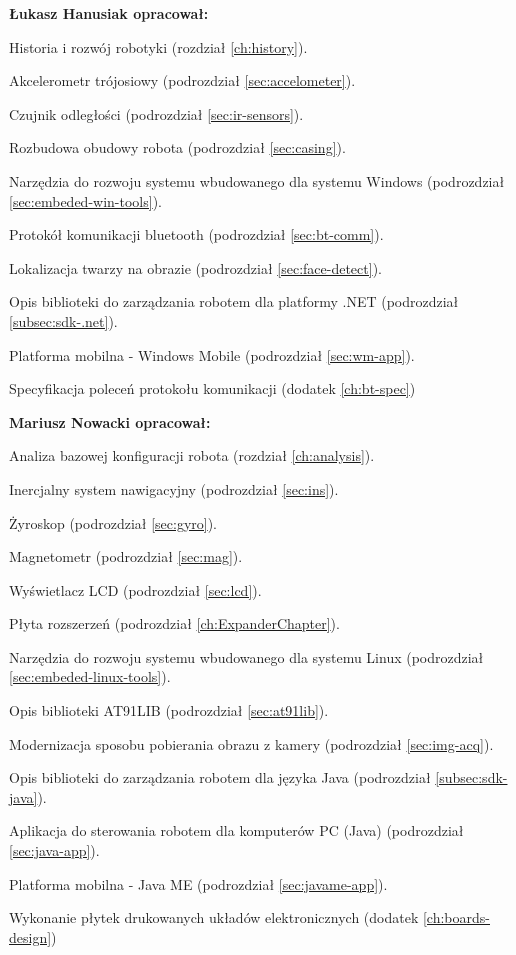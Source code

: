 \documentclass[a4paper,12pt, oneside]{mwbk}
\newenvironment{item-list}
{\begin{itemize}
  \setlength{\itemsep}{0mm}
  \setlength{\parskip}{0pt}
  \setlength{\parsep}{1pt}}
{\end{itemize}}
\begin{document}
\textbf{Łukasz Hanusiak opracował:}
\begin{item-list}
  \item Historia i rozwój robotyki (rozdział \ref{ch:history}).
  \item Akcelerometr trójosiowy (podrozdział \ref{sec:accelometer}).
  \item Czujnik odległości (podrozdział \ref{sec:ir-sensors}).
  \item Rozbudowa obudowy robota (podrozdział \ref{sec:casing}).
  \item Narzędzia do rozwoju systemu wbudowanego dla systemu Windows
  (podrozdział \ref{sec:embeded-win-tools}).
  \item Protokół komunikacji bluetooth (podrozdział \ref{sec:bt-comm}).
  \item Lokalizacja twarzy na obrazie (podrozdział \ref{sec:face-detect}).
  \item Opis biblioteki do zarządzania robotem dla platformy .NET (podrozdział
  \ref{subsec:sdk-.net}).
  \item Platforma mobilna - Windows Mobile (podrozdział \ref{sec:wm-app}).
  \item Specyfikacja poleceń protokołu komunikacji (dodatek \ref{ch:bt-spec})
\end{item-list}

\textbf{Mariusz Nowacki opracował:}
\begin{item-list}
  \item Analiza bazowej konfiguracji robota (rozdział \ref{ch:analysis}).
  \item Inercjalny system nawigacyjny (podrozdział \ref{sec:ins}).
  \item Żyroskop (podrozdział \ref{sec:gyro}).
  \item Magnetometr (podrozdział \ref{sec:mag}).
  \item Wyświetlacz LCD (podrozdział \ref{sec:lcd}).
  \item Płyta rozszerzeń (podrozdział \ref{ch:ExpanderChapter}).
  \item Narzędzia do rozwoju systemu wbudowanego dla systemu Linux (podrozdział
  \ref{sec:embeded-linux-tools}).
  \item Opis biblioteki AT91LIB (podrozdział \ref{sec:at91lib}).
  \item Modernizacja sposobu pobierania obrazu z kamery (podrozdział
  \ref{sec:img-acq}).
  \item Opis biblioteki do zarządzania robotem dla języka Java (podrozdział
  \ref{subsec:sdk-java}).
  \item Aplikacja do sterowania robotem dla komputerów PC (Java) (podrozdział
  \ref{sec:java-app}).
  \item Platforma mobilna - Java ME (podrozdział \ref{sec:javame-app}).
  \item Wykonanie płytek drukowanych układów elektronicznych (dodatek \ref{ch:boards-design})
\end{item-list}
\end{document}
